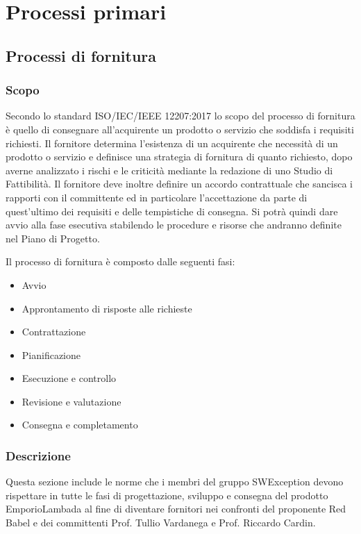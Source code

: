 \section{Processi primari}


\subsection{Processi di fornitura}
\subsubsection{Scopo} 
Secondo lo standard ISO/IEC/IEEE 12207:2017 lo scopo del processo di fornitura è quello di consegnare all'acquirente un prodotto o servizio che soddisfa i requisiti richiesti.  Il fornitore determina l'esistenza di un acquirente che necessità di un prodotto o servizio e definisce una strategia di fornitura di quanto richiesto, dopo averne analizzato i rischi e le criticità mediante la redazione di uno Studio di Fattibilità.
Il fornitore deve inoltre definire un accordo contrattuale che sancisca i rapporti con il committente ed in particolare l'accettazione da parte di quest'ultimo dei requisiti e delle tempistiche di consegna.  Si potrà quindi dare avvio alla fase esecutiva stabilendo le procedure e risorse che andranno definite nel Piano di Progetto.

Il processo di fornitura è composto dalle seguenti fasi:
\begin{itemize}
\item Avvio
\item Approntamento di risposte alle richieste
\item Contrattazione
\item Pianificazione
\item Esecuzione e controllo
\item Revisione e valutazione
\item Consegna e completamento
\end{itemize}

\subsubsection{Descrizione}
Questa sezione include le norme che i membri del gruppo SWException devono rispettare in tutte le fasi di progettazione, sviluppo e consegna del prodotto EmporioLambada al fine di diventare fornitori nei confronti del proponente Red Babel e dei committenti Prof. Tullio Vardanega e Prof. Riccardo Cardin.
